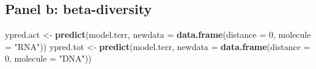 \documentclass[]{article}
\newenvironment{Shaded}{\begin{snugshade}}{\end{snugshade}}
\newcommand{\DataTypeTok}[1]{\textcolor[rgb]{0.13,0.29,0.53}{#1}}
\newcommand{\DecValTok}[1]{\textcolor[rgb]{0.00,0.00,0.81}{#1}}
\newcommand{\KeywordTok}[1]{\textcolor[rgb]{0.13,0.29,0.53}{\textbf{#1}}}
\newcommand{\NormalTok}[1]{#1}
\newcommand{\StringTok}[1]{\textcolor[rgb]{0.31,0.60,0.02}{#1}}
\begin{document}
\hypertarget{panel-b-beta-diversity}{%
\subsection{Panel b: beta-diversity}\label{panel-b-beta-diversity}}

\begin{Shaded}
\begin{Highlighting}[]
\NormalTok{ypred.act <-}\StringTok{ }\KeywordTok{predict}\NormalTok{(model.terr, }\DataTypeTok{newdata =} \KeywordTok{data.frame}\NormalTok{(}\DataTypeTok{distance =} \DecValTok{0}\NormalTok{, }\DataTypeTok{molecule =} \StringTok{"RNA"}\NormalTok{))}
\NormalTok{ypred.tot <-}\StringTok{ }\KeywordTok{predict}\NormalTok{(model.terr, }\DataTypeTok{newdata =} \KeywordTok{data.frame}\NormalTok{(}\DataTypeTok{distance =} \DecValTok{0}\NormalTok{, }\DataTypeTok{molecule =} \StringTok{"DNA"}\NormalTok{))}


\end{Highlighting}
\end{Shaded}
\end{document}
